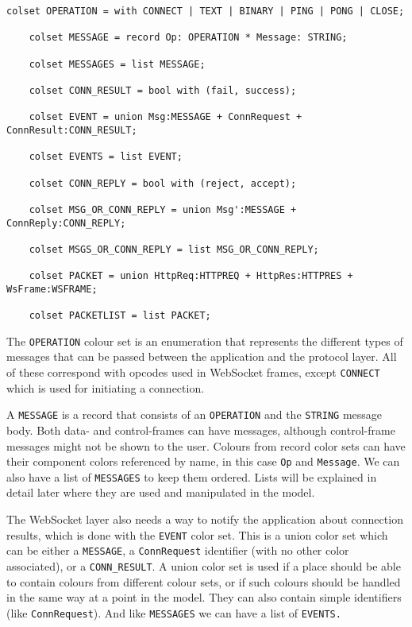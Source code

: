 	\begin{lstlisting}[label=lst:overview_colset,caption=Overview colour
	sets,gobble=1]
	colset OPERATION = with CONNECT | TEXT | BINARY | PING | PONG | CLOSE;
		
	colset MESSAGE = record Op: OPERATION *	Message: STRING;
	
	colset MESSAGES = list MESSAGE;
	
	colset CONN_RESULT = bool with (fail, success);
	
	colset EVENT = union Msg:MESSAGE + ConnRequest + ConnResult:CONN_RESULT;
	
	colset EVENTS = list EVENT;
	
	colset CONN_REPLY = bool with (reject, accept);
	
	colset MSG_OR_CONN_REPLY = union Msg':MESSAGE + ConnReply:CONN_REPLY;
	
	colset MSGS_OR_CONN_REPLY = list MSG_OR_CONN_REPLY;
	
	colset PACKET = union HttpReq:HTTPREQ + HttpRes:HTTPRES + WsFrame:WSFRAME;
	
	colset PACKETLIST = list PACKET;
	\end{lstlisting}
	
	The \lstinline:OPERATION: colour set is an enumeration that represents the
	different types of messages that can be passed between the application and the
	protocol layer. All of these correspond with opcodes
	used in WebSocket frames, except \lstinline:CONNECT: which is used for
	initiating a connection.
	
	A \lstinline:MESSAGE: is a record that consists of an
	\lstinline:OPERATION: and the \lstinline:STRING: message body. Both
	data- and control-frames can have messages, although control-frame
	messages might not be shown to the user. Colours from record color sets can
	have their component colors referenced by name, in this case \lstinline:Op: and \lstinline:Message:. We can also have a list of \lstinline:MESSAGES: to keep them ordered. Lists will be explained in detail
	later where they are used and manipulated in the model.
	
	The WebSocket layer also needs a way to notify the application about connection
	results, which is done with the \lstinline:EVENT: color set. This is a union
	color set which can be either a \lstinline:MESSAGE:, a \lstinline:ConnRequest:
	identifier (with no other color associated), or a \lstinline:CONN_RESULT:. A
	union color set is used if a place should be able to contain colours from
	different colour sets, or if such colours should be handled in the same way at
	a point in the model. They can also contain simple identifiers (like
	\lstinline:ConnRequest:). And like \lstinline:MESSAGES: we can have a list of
	\lstinline:EVENTS.:
	
